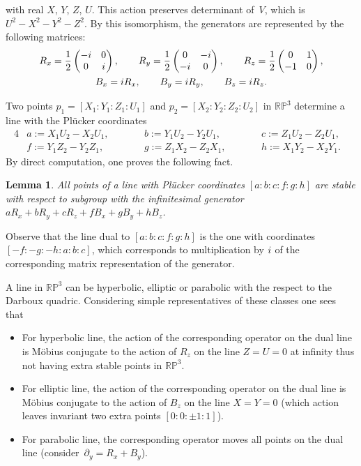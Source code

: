 \documentclass[11pt]{article}
\numberwithin{equation}{section}
\numberwithin{equation}{section}
\newtheorem{Lemma}[Theorem]{Lemma}
\begin{document}
with real $X$, $Y$, $Z$, $U$. This action preserves determinant of~$V$, which is $U^2-X^2-Y^2-Z^2$.
By this isomorphism, the generators are represented by the following matrices:
\begin{gather*}
R_x=\frac{1}{2}\left(
\begin{matrix}
-{\rm i} & 0\\
0 & {\rm i}
\end{matrix}
 \right),\qquad
 R_y=\frac{1}{2}\left(
\begin{matrix}
0 & -{\rm i}\\
-{\rm i} & 0
\end{matrix}
 \right),\qquad
 R_z=\frac{1}{2}\left(
\begin{matrix}
0 & 1\\
-1 & 0
\end{matrix}
 \right),
\\
B_x={\rm i}R_x,\qquad B_y={\rm i}R_y, \qquad B_z={\rm i}R_z.
\end{gather*}

Two points $p_1=[X_1:Y_1:Z_1:U_1]$ and $p_2=[X_2:Y_2:Z_2:U_2]$ in $\mathbb{RP}^3$ determine a line with the Pl\"ucker coordinates
\begin{alignat*}{4}
& a:=X_1U_2-X_2U_1,\qquad&& b:=Y_1U_2-Y_2U_1, \qquad&& c:=Z_1U_2-Z_2U_1,&
\\
& f:=Y_1Z_2-Y_2Z_1,\qquad && g:=Z_1X_2-Z_2X_1, \qquad&& h:=X_1Y_2-X_2Y_1.&
\end{alignat*}
By direct computation, one proves the following fact.
\begin{Lemma}
All points of a line with Pl\"ucker coordinates $[a:b:c:f:g:h]$ are stable with respect to subgroup with the infinitesimal generator $aR_x+bR_y+cR_z+fB_x+gB_y+hB_z$.
\end{Lemma}
Observe that the line dual to $[a:b:c:f:g:h]$ is the one with coordinates $[-f:-g:-h:a:b:c]$, which corresponds to multiplication by ${\rm i}$ of the corresponding matrix representation of the generator.

A line in $\mathbb{RP}^3$ can be hyperbolic, elliptic or parabolic with the respect to the Darboux quadric. Considering simple representatives of these classes one sees that
\begin{itemize}\itemsep=0pt
\item[(1)] For hyperbolic line, the action of the corresponding operator on the dual line is M\"obius conjugate to the action of $R_z$ on the line $Z=U=0$ at infinity thus not having extra stable points in $\mathbb{RP}^3$.

\item[(2)] For elliptic line, the action of the corresponding operator on the dual line is M\"obius conjugate to the action of $B_z$ on the line $X=Y=0$ (which action leaves invariant two extra points $[0:0:\pm1:1]$).

\item[(3)] For parabolic line, the corresponding operator moves all points on the dual line (consider~${\partial_y=R_x+B_y}$).
\end{itemize}
\end{document}
